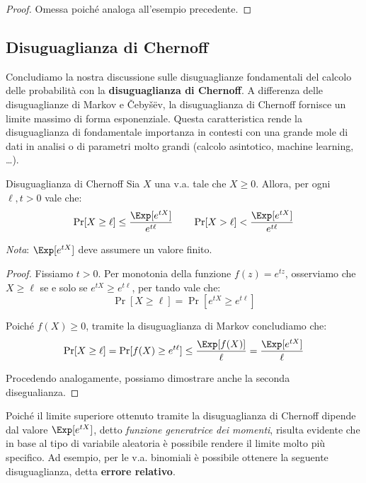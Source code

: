 \documentclass[a4paper, 12pt]{report}
\begin{document}
    \begin{proof}
        Omessa poiché analoga all'esempio precedente.
    \end{proof}
    
    \subsection{Disuguaglianza di Chernoff}

    Concludiamo la nostra discussione sulle disuguaglianze fondamentali del calcolo delle probabilità con la \textbf{disuguaglianza di Chernoff}. A differenza delle disuguaglianze di Markov e Čebyšëv, la disuguaglianza di Chernoff fornisce un limite massimo di forma esponenziale. Questa caratteristica rende la disuguaglianza di fondamentale importanza in contesti con una grande mole di dati in analisi o di parametri molto grandi (calcolo asintotico, machine learning, \dots).
    
    \begin{framedthm}{Disuguaglianza di Chernoff}
        Sia $X$ una v.a. tale che $X \geq 0$. Allora, per ogni $\ell,t > 0$ vale che:
        \[\Pr[X \geq \ell] \leq \frac{\Exp[e^{tX}]}{e^{t\ell}} \qquad \Pr[X > \ell] < \frac{\Exp[e^{tX}]}{e^{t\ell}}\]

        \textit{Nota}: $\Exp[e^{tX}]$ deve assumere un valore finito. 
    \end{framedthm}

    \begin{proof}
        Fissiamo $t > 0$. Per monotonia della funzione $f(z) = e^{tz}$, osserviamo che $X \geq \ell$ se e solo se $e^{tX} \geq e^{t\ell}$, per tando vale che:
        \[\Pr[X \geq \ell] = \Pr[e^{tX} \geq e^{t\ell}]\]

        Poiché $f(X) \geq 0$, tramite la disuguaglianza di Markov concludiamo che:
        \[\Pr[X \geq \ell] = \Pr[f(X) \geq e^{t\ell}] \leq \frac{\Exp[f(X)]}{\ell} = \frac{\Exp[e^{tX}]}{\ell}\]

        Procedendo analogamente, possiamo dimostrare anche la seconda disegualianza.
    \end{proof}

    Poiché il limite superiore ottenuto tramite la disuguaglianza di Chernoff dipende dal valore $\Exp[e^{tX}]$, detto \textit{funzione generatrice dei momenti}, risulta evidente che in base al tipo di variabile aleatoria è possibile rendere il limite molto più specifico. Ad esempio, per le v.a. binomiali è possibile ottenere la seguente disuguaglianza, detta \textbf{errore relativo}.  
\end{document}
